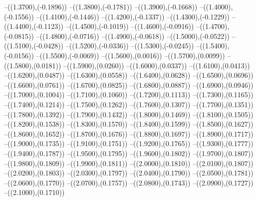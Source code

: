 {	--({\sx*(1.3700)},{\sy*(-0.1896)})
	--({\sx*(1.3800)},{\sy*(-0.1781)})
	--({\sx*(1.3900)},{\sy*(-0.1668)})
	--({\sx*(1.4000)},{\sy*(-0.1556)})
	--({\sx*(1.4100)},{\sy*(-0.1446)})
	--({\sx*(1.4200)},{\sy*(-0.1337)})
	--({\sx*(1.4300)},{\sy*(-0.1229)})
	--({\sx*(1.4400)},{\sy*(-0.1123)})
	--({\sx*(1.4500)},{\sy*(-0.1019)})
	--({\sx*(1.4600)},{\sy*(-0.0916)})
	--({\sx*(1.4700)},{\sy*(-0.0815)})
	--({\sx*(1.4800)},{\sy*(-0.0716)})
	--({\sx*(1.4900)},{\sy*(-0.0618)})
	--({\sx*(1.5000)},{\sy*(-0.0522)})
	--({\sx*(1.5100)},{\sy*(-0.0428)})
	--({\sx*(1.5200)},{\sy*(-0.0336)})
	--({\sx*(1.5300)},{\sy*(-0.0245)})
	--({\sx*(1.5400)},{\sy*(-0.0156)})
	--({\sx*(1.5500)},{\sy*(-0.0069)})
	--({\sx*(1.5600)},{\sy*(0.0016)})
	--({\sx*(1.5700)},{\sy*(0.0099)})
	--({\sx*(1.5800)},{\sy*(0.0181)})
	--({\sx*(1.5900)},{\sy*(0.0260)})
	--({\sx*(1.6000)},{\sy*(0.0337)})
	--({\sx*(1.6100)},{\sy*(0.0413)})
	--({\sx*(1.6200)},{\sy*(0.0487)})
	--({\sx*(1.6300)},{\sy*(0.0558)})
	--({\sx*(1.6400)},{\sy*(0.0628)})
	--({\sx*(1.6500)},{\sy*(0.0696)})
	--({\sx*(1.6600)},{\sy*(0.0761)})
	--({\sx*(1.6700)},{\sy*(0.0825)})
	--({\sx*(1.6800)},{\sy*(0.0887)})
	--({\sx*(1.6900)},{\sy*(0.0946)})
	--({\sx*(1.7000)},{\sy*(0.1004)})
	--({\sx*(1.7100)},{\sy*(0.1060)})
	--({\sx*(1.7200)},{\sy*(0.1113)})
	--({\sx*(1.7300)},{\sy*(0.1165)})
	--({\sx*(1.7400)},{\sy*(0.1214)})
	--({\sx*(1.7500)},{\sy*(0.1262)})
	--({\sx*(1.7600)},{\sy*(0.1307)})
	--({\sx*(1.7700)},{\sy*(0.1351)})
	--({\sx*(1.7800)},{\sy*(0.1392)})
	--({\sx*(1.7900)},{\sy*(0.1432)})
	--({\sx*(1.8000)},{\sy*(0.1469)})
	--({\sx*(1.8100)},{\sy*(0.1505)})
	--({\sx*(1.8200)},{\sy*(0.1538)})
	--({\sx*(1.8300)},{\sy*(0.1570)})
	--({\sx*(1.8400)},{\sy*(0.1599)})
	--({\sx*(1.8500)},{\sy*(0.1627)})
	--({\sx*(1.8600)},{\sy*(0.1652)})
	--({\sx*(1.8700)},{\sy*(0.1676)})
	--({\sx*(1.8800)},{\sy*(0.1697)})
	--({\sx*(1.8900)},{\sy*(0.1717)})
	--({\sx*(1.9000)},{\sy*(0.1735)})
	--({\sx*(1.9100)},{\sy*(0.1751)})
	--({\sx*(1.9200)},{\sy*(0.1765)})
	--({\sx*(1.9300)},{\sy*(0.1777)})
	--({\sx*(1.9400)},{\sy*(0.1787)})
	--({\sx*(1.9500)},{\sy*(0.1795)})
	--({\sx*(1.9600)},{\sy*(0.1802)})
	--({\sx*(1.9700)},{\sy*(0.1807)})
	--({\sx*(1.9800)},{\sy*(0.1809)})
	--({\sx*(1.9900)},{\sy*(0.1811)})
	--({\sx*(2.0000)},{\sy*(0.1810)})
	--({\sx*(2.0100)},{\sy*(0.1807)})
	--({\sx*(2.0200)},{\sy*(0.1803)})
	--({\sx*(2.0300)},{\sy*(0.1797)})
	--({\sx*(2.0400)},{\sy*(0.1790)})
	--({\sx*(2.0500)},{\sy*(0.1781)})
	--({\sx*(2.0600)},{\sy*(0.1770)})
	--({\sx*(2.0700)},{\sy*(0.1757)})
	--({\sx*(2.0800)},{\sy*(0.1743)})
	--({\sx*(2.0900)},{\sy*(0.1727)})
	--({\sx*(2.1000)},{\sy*(0.1710)})
}
